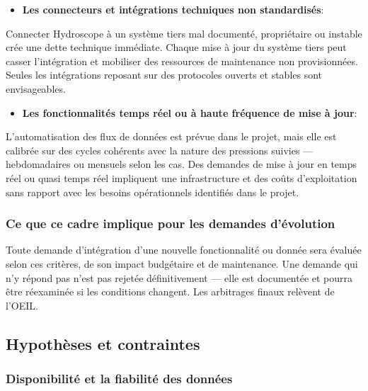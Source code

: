 \documentclass[
  french,
  11pt,
]{article}
\providecommand{\tightlist}{%
  \setlength{\itemsep}{0pt}\setlength{\parskip}{0pt}}
\begin{document}
\begin{itemize}
\tightlist
\item
  \textbf{Les connecteurs et intégrations techniques non standardisés}:
\end{itemize}

Connecter Hydroscope à un système tiers mal documenté, propriétaire ou
instable crée une dette technique immédiate. Chaque mise à jour du
système tiers peut casser l'intégration et mobiliser des ressources de
maintenance non provisionnées. Seules les intégrations reposant sur des
protocoles ouverts et stables sont envisageables.

\begin{itemize}
\tightlist
\item
  \textbf{Les fonctionnalités temps réel ou à haute fréquence de mise à
  jour}:
\end{itemize}

L'automatisation des flux de données est prévue dans le projet, mais
elle est calibrée sur des cycles cohérents avec la nature des pressions
suivies --- hebdomadaires ou mensuels selon les cas. Des demandes de
mise à jour en temps réel ou quasi temps réel impliquent une
infrastructure et des coûts d'exploitation sans rapport avec les besoins
opérationnels identifiés dans le projet.

\subsubsection{Ce que ce cadre implique pour les demandes
d'évolution}\label{ce-que-ce-cadre-implique-pour-les-demandes-duxe9volution}

Toute demande d'intégration d'une nouvelle fonctionnalité ou donnée sera
évaluée selon ces critères, de son impact budgétaire et de maintenance.
Une demande qui n'y répond pas n'est pas rejetée définitivement --- elle
est documentée et pourra être réexaminée si les conditions changent. Les
arbitrages finaux relèvent de l'OEIL.

\subsection{Hypothèses et
contraintes}\label{hypothuxe8ses-et-contraintes}

\subsubsection{Disponibilité et la fiabilité des
données}\label{disponibilituxe9-et-la-fiabilituxe9-des-donnuxe9es}
\end{document}

